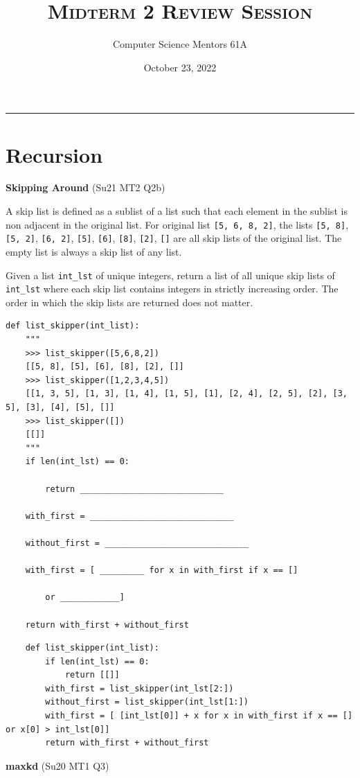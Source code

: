 \documentclass{exam}
\author{ \Large \sc Computer Science Mentors 61A}
\title{\textsc{Midterm 2 Review Session}}
\date{October 23, 2022}
\let\oldmaketitle\maketitle
\renewcommand{\maketitle}[0]{\oldmaketitle \thispagestyle{headandfoot}}
\newlength{\currentparskip}
\newenvironment{blocksection}
{
    \setlength{\currentparskip}{\parskip}%
    \begin{minipage}{\linewidth}
    \setlength{\parskip}{\currentparskip}%
}
{
    \end{minipage}
}
\begin{document}
    \maketitle
    \rule{\textwidth}{0.15em}


\section{Recursion}
\begin{questions}
\begin{blocksection}
\question \textbf{Skipping Around} (Su21 MT2 Q2b)

A skip list is defined as a sublist of a list such that each element in the sublist is non adjacent in the
original list. For original list \lstinline{[5, 6, 8, 2]}, the lists \lstinline{[5, 8]}, \lstinline{[5, 2]}, \lstinline{[6, 2]}, \lstinline{[5]}, \lstinline{[6]}, \lstinline{[8]}, \lstinline{[2]}, \lstinline{[]} are
all skip lists of the original list. The empty list is always a skip list of any list.

Given a list \lstinline{int_lst} of unique integers, return a list of all unique skip lists of \lstinline{int_lst} where each skip
list contains integers in strictly increasing order. The order in which the skip lists are returned does not matter.
    
\begin{lstlisting}
def list_skipper(int_list):
    """
    >>> list_skipper([5,6,8,2])
    [[5, 8], [5], [6], [8], [2], []]
    >>> list_skipper([1,2,3,4,5])
    [[1, 3, 5], [1, 3], [1, 4], [1, 5], [1], [2, 4], [2, 5], [2], [3, 5], [3], [4], [5], []]
    >>> list_skipper([])
    [[]]
    """
    if len(int_lst) == 0:

        return _____________________________

    with_first = _____________________________

    without_first = _____________________________

    with_first = [ _________ for x in with_first if x == [] 
    
        or ____________]

    return with_first + without_first
\end{lstlisting}
\end{blocksection}
\begin{solution}
    \begin{lstlisting}
    def list_skipper(int_list):
        if len(int_lst) == 0:
            return [[]]
        with_first = list_skipper(int_lst[2:])
        without_first = list_skipper(int_lst[1:])
        with_first = [ [int_lst[0]] + x for x in with_first if x == [] or x[0] > int_lst[0]]
        return with_first + without_first
    \end{lstlisting}
\end{solution}
\begin{blocksection}
\question \textbf{maxkd} (Su20 MT1 Q3)


\end{blocksection}
\end{questions}
\end{document}
